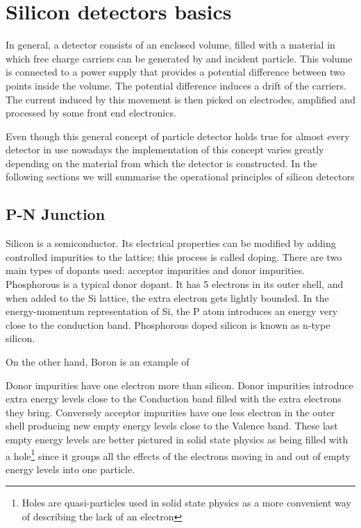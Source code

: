 \chapter{Silicon detectors basics} %
\label{cha:simulator_development}

In general, a detector consists of an enclosed volume, filled with a material in which free charge carriers can be generated by and incident particle. This volume is connected to a power supply that provides a  potential difference between two points inside the volume. The potential difference induces a drift of the carriers. The current induced by this movement is then picked on electrodes, amplified and processed by some front end electronics.

Even though this general concept of particle detector holds true for almost every detector in use nowadays the implementation of this concept varies greatly depending on the material from which the detector is constructed. In the following sections we will summarise the operational principles of silicon detectors

\section{P-N Junction}

Silicon is a semiconductor. Its electrical properties can be modified by adding controlled impurities to the lattice; this process is called doping. There are two main types of dopants used: acceptor impurities and donor impurities. Phosphorous is a typical donor dopant. It has 5 electrons in its outer shell, and when added to the Si lattice, the extra electron gets lightly bounded. In the energy-momentum representation of Si, the P atom introduces an energy very close to the conduction band. Phosphorous doped silicon is known as n-type silicon. 

On the other hand, Boron is an example of 

Donor impurities have one electron more than silicon. Donor impurities introduce extra energy levels close to the Conduction band filled with the extra electrons they bring. Conversely acceptor impurities have one less electron in the outer shell producing new empty energy levels close to the Valence band. These last empty energy levels are better pictured in solid state physics as being filled with a hole\footnote{Holes are quasi-particles used in solid state physics as a more convenient way of describing the lack of an electron} since it groups all the effects of the electrons moving in and out of empty energy levels into one particle.

